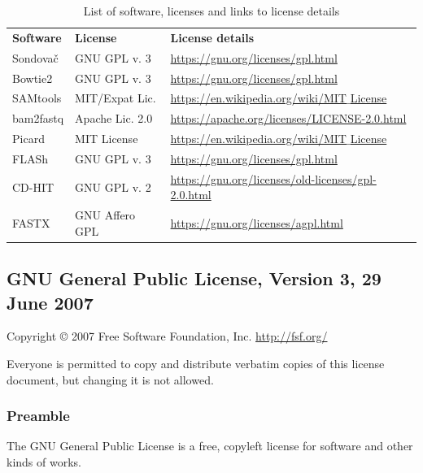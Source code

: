 \documentclass[a4paper, 11pt, twoside]{article}
\begin{document}
\begin{table}[htb]
\caption[List of software and licenses]{List of software, licenses and links to license details}
\begin{tabular}{lll}
\textbf{Software} & \textbf{License} & \textbf{License details}\\
Sondovač & GNU GPL v. 3 & \href{https://gnu.org/licenses/gpl.html}{https://gnu.org/licenses/gpl.html}\\
Bowtie2 & GNU GPL v. 3 & \href{https://gnu.org/licenses/gpl.html}{https://gnu.org/licenses/gpl.html}\\
SAMtools & MIT/Expat Lic. & \href{https://en.wikipedia.org/wiki/MIT_License}{https://en.wikipedia.org/wiki/MIT$\_$License}\\
bam2fastq & Apache Lic. 2.0 & \href{https://apache.org/licenses/LICENSE-2.0.html}{https://apache.org/licenses/LICENSE-2.0.html}\\
Picard & MIT License & \href{https://en.wikipedia.org/wiki/MIT_License}{https://en.wikipedia.org/wiki/MIT$\_$License}\\
FLASh & GNU GPL v. 3 & \href{https://gnu.org/licenses/gpl.html}{https://gnu.org/licenses/gpl.html}\\
CD-HIT & GNU GPL v. 2 & \href{https://gnu.org/licenses/old-licenses/gpl-2.0.html}{https://gnu.org/licenses/old-licenses/gpl-2.0.html}\\
FASTX & GNU Affero GPL & \href{https://gnu.org/licenses/agpl.html}{https://gnu.org/licenses/agpl.html}
\end{tabular}
\label{software-lic}
\end{table}

\begingroup
\fontsize{7pt}{8pt}
\selectfont

\subsection{GNU General Public License, Version 3, 29 June 2007}

Copyright © 2007 Free Software Foundation, Inc. \href{http://fsf.org/}{http://fsf.org/}

Everyone is permitted to copy and distribute verbatim copies of this license document, but changing it is not allowed.

\subsubsection{Preamble}

The GNU General Public License is a free, copyleft license for software and other kinds of works.
\end{document}

